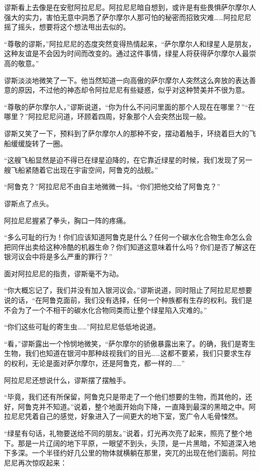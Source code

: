 谬斯看上去像是在安慰阿拉尼尼。阿拉尼尼暗自想到，或许是有些畏惧萨尔摩尔人强大的实力，害怕无意中洞悉了萨尔摩尔人那可怕的秘密而招致灾难……阿拉尼尼摇了摇头，想要将这个想法甩出去似的。

“尊敬的谬斯，”阿拉尼尼的态度突然变得热情起来，“萨尔摩尔人和绿星人是朋友，这种友谊是不会因为时间而改变的。通过这件事情，绿星人将获得萨尔摩尔人最崇高的敬意。”

谬斯淡淡地微笑了一下。他当然知道一向高傲的萨尔摩尔人突然这么奔放的表达善意的原因，不过他的神态却令阿拉尼尼有些疑惑，似乎对这种赞美并不很为意。

“尊敬的萨尔摩尔人，”谬斯说道，“你为什么不问问里面的那个人现在在哪里？”“在哪里？”阿拉尼尼问道，环顾着四周，好象那个人会突然出现一般。

谬斯又笑了一下，预料到了萨尔摩尔人的那种不安，摆动着触手，环绕着巨大的飞船缓缓旋转了一圈。

“这艘飞船显然是迫不得已在绿星迫降的，在它靠近绿星的时候，我们发现了另一艘飞船紧随着它出现在宇宙空间，阿鲁克的战舰。”

“阿鲁克？”阿拉尼尼不由自主地微微一抖。“你们把他交给了阿鲁克？”

谬斯点了点头。

阿拉尼尼握紧了拳头，胸口一阵的疼痛。

“多么可耻的行为！你们应该知道阿鲁克是什么？任何一个碳水化合物生命怎么会把同伴出卖给这种冷酷的机器生命？你们知道这意味着什么吗？你们是否了解这在银河议会中将是多么严重的罪行？”

面对阿拉尼尼的指责，谬斯毫不为动。

“你大概忘记了，我们并没有加入银河议会。”谬斯说道，同时阻止了阿拉尼尼想要说的话，“在阿鲁克面前，我们没有选择，任何一个种族都有生存的权利。我们是不会为了一个不相干的碳水化合物同类而让整个绿星陷入灾难的。”

“你们这些可耻的寄生虫……”阿拉尼尼低低地说道。

“看，”谬斯露出一个怜悯地微笑，“萨尔摩尔的骄傲暴露出来了。的确，我们是寄生生物，我们也知道在银河中那种歧视我们的目光……这都不要紧，我们只要求生存的权利，无论是面对萨尔摩尔，还是阿鲁克，都一样的……”

阿拉尼尼还想说什么，谬斯摆了摆触手。

“毕竟，我们还有所保留，阿鲁克只是带走了一个他们想要的生物，而其他的，还好，阿鲁克并不知道。”说着，整个地面开始向下降，一直降到最深的黑暗之中。阿拉尼尼凭着自己的感觉，好象进入了一间更大的地下室，宽广令人毛骨悚然。

“绿星有句话，礼物要送给不同的朋友。”说着，灯光再次亮了起来，照亮了整个地下。那是一片辽阔的地下平原，一眼望不到头，头顶，是一片黑暗，不知道深入地下多深。一个半径约好几公里的物体就横躺在那里，突兀的出现在他们面前。阿拉尼尼再次惊叹起来：

